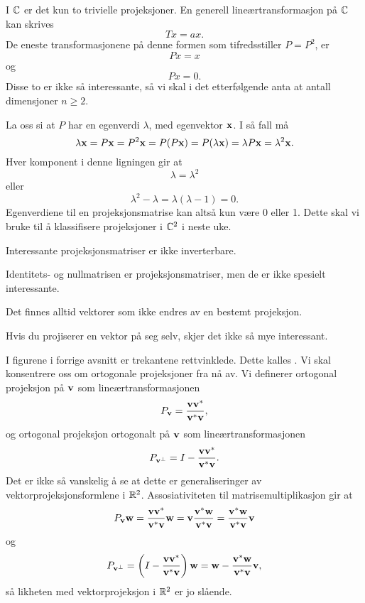  I $\mathbb{C}$ er det kun to trivielle projeksjoner. En generell lineærtransformasjon på $\mathbb{C}$ kan skrives 
 \[
 Tx=ax.
 \]
De eneste transformasjonene på denne formen som tifredsstiller $P=P^2$, er
 \[
 Px=x
\]
og 
 \[
 Px=0.
\]
Disse to er ikke så interessante, så vi skal i det etterfølgende anta at antall dimensjoner $n\geq 2$.

La oss si at $P$ har en egenverdi $\lambda$, med egenvektor $\mathbf{x}$. I så fall må
\[
\lambda \mathbf{x}=P\mathbf{x}=P^2\mathbf{x}=P(P\mathbf{x})=P(\lambda\mathbf{x})=\lambda P\mathbf{x}=\lambda^2 \mathbf{x}.
\]
Hver komponent i denne ligningen gir at
\[
\lambda=\lambda^2
\]
eller
\[
\lambda^2-\lambda=\lambda(\lambda-1)=0.
\]
Egenverdiene til en projeksjonsmatrise kan altså kun være  0 eller 1. Dette skal vi bruke til å klassifisere projeksjoner i $\mathbb{C}^2$ i neste uke.
 
\begin{fishythm}
Interessante projeksjonsmatriser er ikke inverterbare.
\end{fishythm}

\begin{merkx}
Identitets- og nullmatrisen er projeksjonsmatriser, men de er ikke spesielt interessante.
\end{merkx}

\begin{fishythm}
Det finnes alltid vektorer som ikke endres av en bestemt projeksjon.
\end{fishythm}

\begin{merkx}
Hvis du projiserer en vektor på seg selv, skjer det ikke så mye interessant.
\end{merkx}


 
 I figurene i forrige avsnitt er trekantene rettvinklede. Dette kalles . 
 Vi skal konsentrere oss om ortogonale projeksjoner fra nå av.
 Vi definerer ortogonal projeksjon på $\mathbf{v}$ som lineærtransformasjonen
 \[
 P_{\mathbf{v}}=\frac{\mathbf{v} \mathbf{v}^*}{\mathbf{v}^* \mathbf{v}},
 \]
 og ortogonal projeksjon ortogonalt på $\mathbf{v}$ som lineærtransformasjonen
 \[
 P_{\mathbf{v}^{\perp}}=I-\frac{\mathbf{v} \mathbf{v}^*}{\mathbf{v}^* \mathbf{v}}.
 \]
Det er ikke så vanskelig å se at dette er generaliseringer av vektorprojeksjonsformlene i $\mathbb{R}^2$. Assosiativiteten til matrisemultiplikasjon gir at
 \[
 P_{\mathbf{v}}\mathbf{w}=\frac{\mathbf{v} \mathbf{v}^*}{\mathbf{v}^* \mathbf{v}} \mathbf{w}=\mathbf{v} \frac{ \mathbf{v}^*\mathbf{w}}{\mathbf{v}^* \mathbf{v}}=\frac{ \mathbf{v}^*\mathbf{w}}{\mathbf{v}^* \mathbf{v}} \mathbf{v} 
 \]
og 
 \[
 P_{\mathbf{v}^{\perp}}=\left(I-\frac{\mathbf{v} \mathbf{v}^*}{\mathbf{v}^* \mathbf{v}}\right)\mathbf{w}=\mathbf{w} - \frac{ \mathbf{v}^*\mathbf{w}}{\mathbf{v}^* \mathbf{v}} \mathbf{v} ,
 \]
 så likheten med vektorprojeksjon i $\mathbb{R}^2$ er jo slående.


